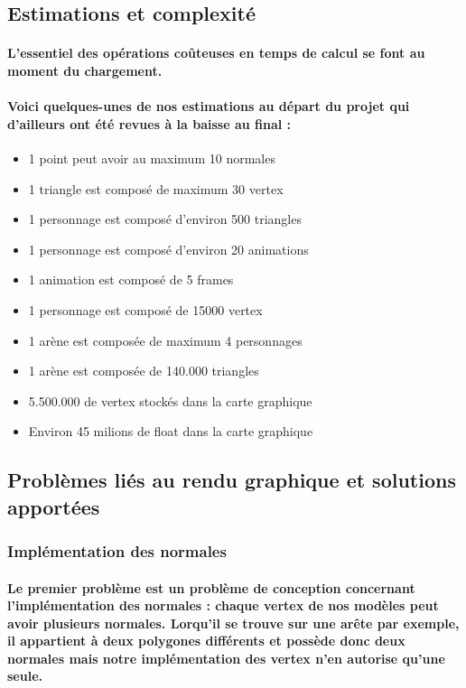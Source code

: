\subsection{Estimations et complexité}
\paragraph{L'essentiel des opérations coûteuses en temps de calcul se font au moment du chargement.}

\paragraph{Voici quelques-unes de nos estimations au départ du projet qui d'ailleurs ont été revues à la baisse au final :}
\begin{itemize}
	\item 1 point peut avoir au maximum 10 normales
	\item 1 triangle est composé de maximum 30 vertex
	\item 1 personnage est composé d'environ 500 triangles
	\item 1 personnage est composé d'environ 20 animations
	\item 1 animation est composé de 5 frames
	\item 1 personnage est composé de 15000 vertex
	\item 1 arène est composée de maximum 4 personnages
	\item 1 arène est composée de 140.000 triangles
	\item 5.500.000 de vertex stockés dans la carte graphique
	\item Environ 45 milions de float dans la carte graphique
\end{itemize}


\subsection{Problèmes liés au rendu graphique et solutions apportées}
\subsubsection{Implémentation des normales}

\paragraph{Le premier problème est un problème de conception concernant l'implémentation des normales : chaque vertex de nos modèles peut avoir plusieurs normales. Lorqu'il se trouve sur une arête par exemple, il appartient à deux polygones différents et possède donc deux normales mais notre implémentation des vertex n'en autorise qu'une seule.}



